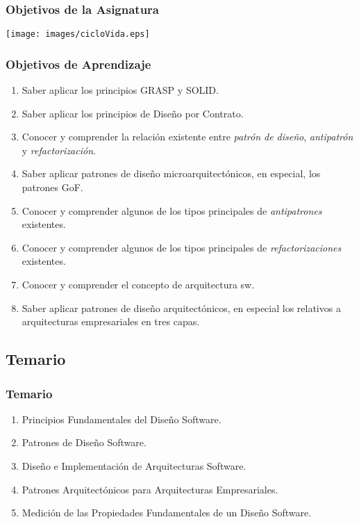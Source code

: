 \documentclass[a4paper,slidestop,xcolor=pst,blue]{beamer}
\begin{document}
\begin{frame}[c]
	\frametitle{Objetivos de la Asignatura}
    \begin{center}
        \texttt{[image: images/cicloVida.eps]}
    \end{center}
\end{frame}

\begin{frame}[c]
	\frametitle{Objetivos de Aprendizaje}
    \begin{enumerate}[<+->]
            \item Saber aplicar los principios \alert{GRASP} y \alert{SOLID}.
            \item Saber aplicar los principios de \alert{Diseño por Contrato}.
            \item Conocer y comprender la relación existente entre \alert{\emph{patrón de diseño}}, \alert{\emph{antipatrón}} y \alert{\emph{refactorización}}.
            \item Saber aplicar patrones de diseño microarquitectónicos, en especial, los \alert{patrones GoF}.
            \item Conocer y comprender algunos de los tipos principales de \alert{\emph{antipatrones}} existentes.
            \item Conocer y comprender algunos de los tipos principales de \alert{\emph{refactorizaciones}} existentes.
            \item Conocer y comprender el concepto de arquitectura sw.
            \item Saber aplicar patrones de diseño arquitectónicos, en especial los relativos a \alert{arquitecturas empresariales en tres capas}.
    \end{enumerate}
\end{frame}

\subsection{Temario}

\begin{frame}[c]
	\frametitle{Temario}
	\begin{enumerate}
		\item<1-> Principios Fundamentales del Diseño Software.
		\item<2-> Patrones de Diseño Software.
		\item<3-> Diseño e Implementación de Arquitecturas Software.
		\item<4-> Patrones Arquitectónicos para Arquitecturas Empresariales.
        \item<5-> Medición de las Propiedades Fundamentales de un Diseño Software.
	\end{enumerate}
\end{frame}
\end{document}
